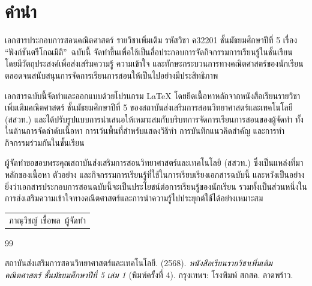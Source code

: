 \documentclass[a4paper,oneside,12pt]{book}
\begin{document}
\newpage
\thispagestyle{empty} %
\newpage

\chapter*{คำนำ}

เอกสารประกอบการสอนคณิตศาสตร์ รายวิชาเพิ่มเติม รหัสวิชา ค32201 ชั้นมัธยมศึกษาปีที่ 5 เรื่อง \textquotedblleft ฟังก์ชันตรีโกณมิติ\textquotedblright\ ฉบับนี้ จัดทำขึ้นเพื่อใช้เป็นสื่อประกอบการจัดกิจกรรมการเรียนรู้ในชั้นเรียน โดยมีวัตถุประสงค์เพื่อส่งเสริมความรู้ ความเข้าใจ และทักษะกระบวนการทางคณิตศาสตร์ของนักเรียน ตลอดจนสนับสนุนการจัดการเรียนการสอนให้เป็นไปอย่างมีประสิทธิภาพ

เอกสารฉบับนี้จัดทำและออกแบบด้วยโปรแกรม \LaTeX{} โดยยึดเนื้อหาหลักจากหนังสือเรียนรายวิชาเพิ่มเติมคณิตศาสตร์ ชั้นมัธยมศึกษาปีที่ 5 ของสถาบันส่งเสริมการสอนวิทยาศาสตร์และเทคโนโลยี (สสวท.) และได้ปรับรูปแบบการนำเสนอให้เหมาะสมกับบริบทการจัดการเรียนการสอนของผู้จัดทำ ทั้งในด้านการจัดลำดับเนื้อหา การเว้นพื้นที่สำหรับแสดงวิธีทำ การบันทึกแนวคิดสำคัญ และการทำกิจกรรมร่วมกันในชั้นเรียน

ผู้จัดทำขอขอบพระคุณสถาบันส่งเสริมการสอนวิทยาศาสตร์และเทคโนโลยี (สสวท.) ซึ่งเป็นแหล่งที่มาหลักของเนื้อหา ตัวอย่าง และกิจกรรมการเรียนรู้ที่ใช้ในการเรียบเรียงเอกสารฉบับนี้ และหวังเป็นอย่างยิ่งว่าเอกสารประกอบการสอนฉบับนี้จะเป็นประโยชน์ต่อการเรียนรู้ของนักเรียน รวมทั้งเป็นส่วนหนึ่งในการส่งเสริมความเข้าใจทางคณิตศาสตร์และการนำความรู้ไปประยุกต์ใช้ได้อย่างเหมาะสม

\vspace{1.5cm}

\begin{flushright}
	\begin{tabular}{c}
		ภาณุวิชญ์ เชื้อพล\
		ผู้จัดทำ
	\end{tabular}
\end{flushright}

	\frontmatter
	\tableofcontents
	\clearpage
	
	\mainmatter
		

\clearpage


\begingroup

\setcounter{chapter}{0}

\renewcommand{\bibname}{บรรณานุกรม}

\begin{thebibliography}{99}
	
	สถาบันส่งเสริมการสอนวิทยาศาสตร์และเทคโนโลยี. (2568).
	\textit{หนังสือเรียนรายวิชาเพิ่มเติมคณิตศาสตร์ ชั้นมัธยมศึกษาปีที่ 5 เล่ม 1} (พิมพ์ครั้งที่ 4).
	กรุงเทพฯ: โรงพิมพ์ สกสค. ลาดพร้าว.
	
\end{thebibliography}

\endgroup			
\end{document}
